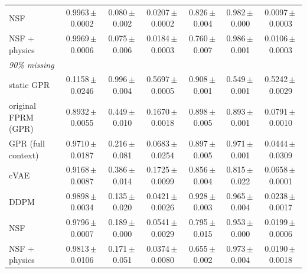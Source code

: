 \begin{tabular}{lcccccc}
NSF & 0.9963\,$\pm$\,0.0002 & 0.080\,$\pm$\,0.002 & 0.0207\,$\pm$\,0.0002 & 0.826\,$\pm$\,0.004 & 0.982\,$\pm$\,0.000 & 0.0097\,$\pm$\,0.0003\\
NSF + physics & 0.9969\,$\pm$\,0.0006 & 0.075\,$\pm$\,0.006 & 0.0184\,$\pm$\,0.0003 & 0.760\,$\pm$\,0.007 & 0.986\,$\pm$\,0.001 & 0.0106\,$\pm$\,0.0003\\
\midrule
\multicolumn{7}{l}{\textit{90\% missing}}\\
static GPR & 0.1158\,$\pm$\,0.0246 & 0.996\,$\pm$\,0.004 & 0.5697\,$\pm$\,0.0005 & 0.908\,$\pm$\,0.001 & 0.549\,$\pm$\,0.001 & 0.5242\,$\pm$\,0.0029\\
original FPRM (GPR) & 0.8932\,$\pm$\,0.0055 & 0.449\,$\pm$\,0.010 & 0.1670\,$\pm$\,0.0018 & 0.898\,$\pm$\,0.005 & 0.893\,$\pm$\,0.001 & 0.0791\,$\pm$\,0.0010\\
GPR (full context) & 0.9710\,$\pm$\,0.0187 & 0.216\,$\pm$\,0.081 & 0.0683\,$\pm$\,0.0254 & 0.897\,$\pm$\,0.005 & 0.971\,$\pm$\,0.001 & 0.0444\,$\pm$\,0.0309\\
cVAE & 0.9168\,$\pm$\,0.0087 & 0.386\,$\pm$\,0.014 & 0.1725\,$\pm$\,0.0099 & 0.856\,$\pm$\,0.004 & 0.815\,$\pm$\,0.022 & 0.0658\,$\pm$\,0.0001\\
DDPM & 0.9898\,$\pm$\,0.0034 & 0.135\,$\pm$\,0.020 & 0.0421\,$\pm$\,0.0026 & 0.928\,$\pm$\,0.003 & 0.965\,$\pm$\,0.004 & 0.0238\,$\pm$\,0.0017\\
NSF & 0.9796\,$\pm$\,0.0007 & 0.189\,$\pm$\,0.000 & 0.0541\,$\pm$\,0.0029 & 0.795\,$\pm$\,0.015 & 0.953\,$\pm$\,0.000 & 0.0199\,$\pm$\,0.0006\\
NSF + physics & 0.9813\,$\pm$\,0.0106 & 0.171\,$\pm$\,0.051 & 0.0374\,$\pm$\,0.0080 & 0.655\,$\pm$\,0.002 & 0.973\,$\pm$\,0.004 & 0.0190\,$\pm$\,0.0018\\
\bottomrule
\end{tabular}
